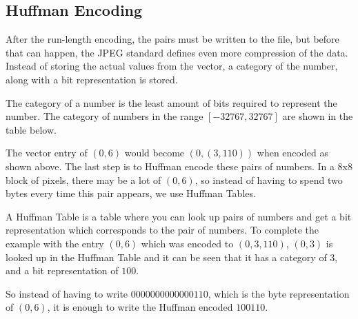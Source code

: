 \begin{infobox}
\vspace{4mm}
\subsection*{Huffman Encoding}
\vspace{-2.5mm}
After the run-length encoding, the pairs must be written to the file, but before that can happen, the JPEG standard defines even more compression of the data. Instead of storing the actual values from the vector, a category of the number, along with a bit representation is stored. 

The category of a number is the least amount of bits required to represent the number. The category of numbers in the range $[-32767, 32767]$ are shown in the table below.

\begin{centering}
\end{centering}

The vector entry of $(0,6)$ would become $(0,(3,110))$ when encoded as shown above. The last step is to Huffman encode these pairs of numbers.
In a 8x8 block of pixels, there may be a lot of $(0,6)$, so instead of having to spend two bytes every time this pair appears, we use Huffman Tables. 

A Huffman Table is a table where you can look up pairs of numbers and get a bit representation which corresponds to the pair of numbers. To complete the example with the entry $(0,6)$ which was encoded to $(0,3,110)$, $(0,3)$ is looked up in the Huffman Table and it can be seen that it has a category of $3$, and a bit representation of $100$. 

So instead of having to write $0000 0000 0000 0110$, which is the byte representation of $(0,6)$, it is enough to write the Huffman encoded $100110$.


\end{infobox}

